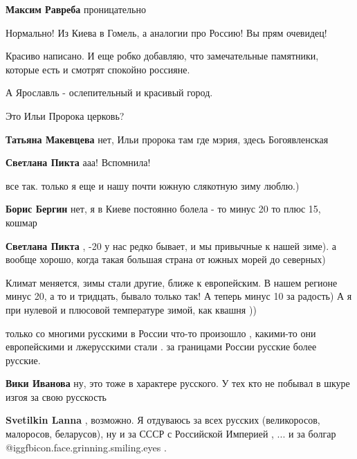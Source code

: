 \begin{itemize}
\begin{itemize}
\textbf{Максим Равреба} проницательно

Нормально! Из Киева в Гомель, а аналогии про Россию! Вы прям очевидец!

\end{itemize} %

Красиво написано. И еще робко добавляю, что замечательные памятники, которые есть и смотрят спокойно россияне.

А Ярославль - ослепительный и красивый город.

Это Ильи Пророка церковь?

\begin{itemize} %
\textbf{Татьяна Макевцева} нет, Ильи пророка там где мэрия, здесь Богоявленская

\textbf{Светлана Пикта} ааа! Вспомнила!
\end{itemize} %

все так. только я еще и нашу почти южную слякотную зиму люблю.)

\begin{itemize} %
\textbf{Борис Бергин} нет, я в Киеве постоянно болела - то минус 20 то плюс 15, кошмар

\textbf{Светлана Пикта} , -20 у нас редко бывает, и мы привычные к нашей зиме). а вообще хорошо, когда такая большая страна от южных морей до северных)


Климат меняется, зимы стали другие, ближе к европейским. В нашем регионе минус
20, а то и тридцать, бывало только так! А теперь минус 10 за радость) А я при
нулевой и плюсовой температуре зимой, как квашня ))

\end{itemize} %


только со многими русскими в России что-то произошло , какими-то они
европейскими и лжерусскими стали . за границами России русские более русские.

\begin{itemize} %
\textbf{Вики Иванова} ну, это тоже в характере русского. У тех кто не побывал в шкуре изгоя за свою русскость

\textbf{Svetilkin Lanna} , возможно. Я отдуваюсь за всех русских (великоросов, малоросов, беларусов), ну и за СССР с Российской Империей , ... и за болгар @igg{fbicon.face.grinning.smiling.eyes} .
\end{itemize} %


\end{itemize}

